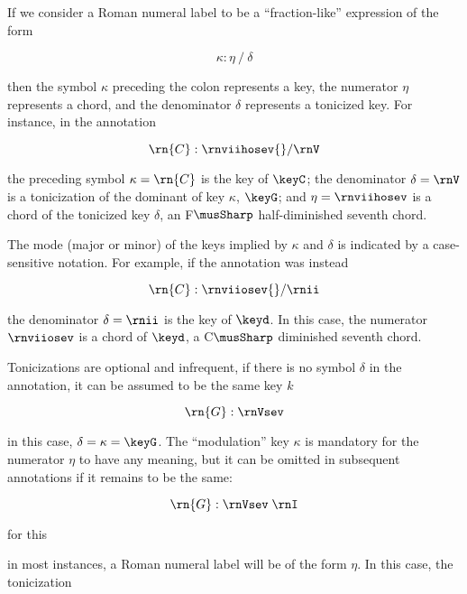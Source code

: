
If we consider a Roman numeral label to be a
``fraction-like'' expression of the form

\begin{equation}
    \kappa : \eta \: / \: \delta
\end{equation}

then the symbol $\kappa$ preceding the colon represents a
key, the numerator $\eta$ represents a chord, and the
denominator $\delta$ represents a tonicized key. For
instance, in the annotation 

\begin{equation}
    \rn{C}:\rnviihosev{}/\rnV
\end{equation}

the preceding symbol $\kappa=\rn{C}$ is the key of $\keyC$;
the denominator $\delta = \rnV$ is a tonicization of the
dominant of key $\kappa$, $\keyG$; and $\eta=\rnviihosev$ is
a chord of the tonicized key $\delta$, an F$\musSharp$
half-diminished seventh chord.

The mode (major or minor) of the keys implied by $\kappa$
and $\delta$ is indicated by a case-sensitive notation. For
example, if the annotation was instead

\begin{equation}
    \rn{C}:\rnviiosev{}/\rnii
\end{equation}

the denominator $\delta=\rnii$ is the key of $\keyd$. In
this case, the numerator $\rnviiosev$ is a chord of $\keyd$,
a C$\musSharp$ diminished seventh chord.

Tonicizations are optional and infrequent, if there is no
symbol $\delta$ in the annotation, it can be assumed to be
the same key $k$

\begin{equation}
    \rn{G}:\rnVsev
\end{equation}

in this case, $\delta = \kappa = \keyG$. The ``modulation''
key $\kappa$ is mandatory for the numerator $\eta$ to have
any meaning, but it can be omitted in subsequent annotations
if it remains to be the same:

\begin{equation}
    \rn{G}:\rnVsev \; \rnI
\end{equation}

for this 

in most instances, a Roman numeral label will be of the form
$\eta$. In this case, the tonicization 
